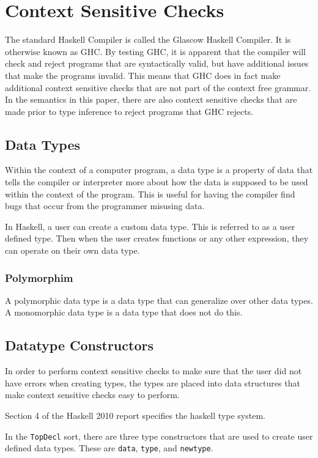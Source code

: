 \chapter{Context Sensitive Checks}
The standard Haskell Compiler is called the Glascow Haskell Compiler. It is otherwise known as GHC. By testing GHC, it is apparent that the compiler will check and reject programs that are syntactically valid, but have additional issues that make the programs invalid. This means that GHC does in fact make additional context sensitive checks that are not part of the context free grammar. In the semantics in this paper, there are also context sensitive checks that are made prior to type inference to reject programs that GHC rejects.

\section{Data Types}
Within the context of a computer program, a data type is a property of data that tells the compiler or interpreter more about how the data is supposed to be used within the context of the program. This is useful for having the compiler find bugs that occur from the programmer misusing data. \cite{Foldoc:Type}

In Haskell, a user can create a custom data type. This is referred to as a user defined type. Then when the user creates functions or any other expression, they can operate on their own data type.

\subsection{Polymorphim}
A polymorphic data type is a data type that can generalize over other data types.
A monomorphic data type is a data type that does not do this.

\section{Datatype Constructors}

In order to perform context sensitive checks to make sure that the user did not have errors when creating types, the types are placed into data structures that make context sensitive checks easy to perform.

Section 4 of the Haskell 2010 report \cite{Report:104} specifies the haskell type system.

In the \texttt{TopDecl} sort, there are three type constructors that are used to create user defined data types. These are \texttt{data}, \texttt{type}, and \texttt{newtype}.


